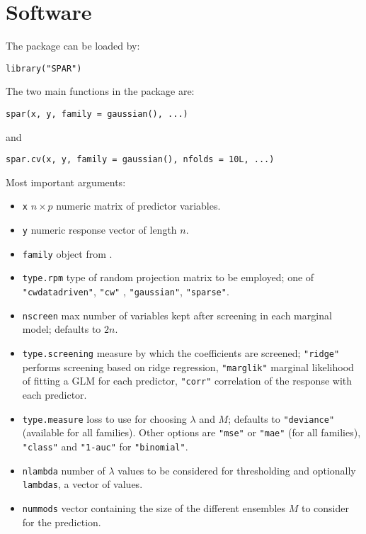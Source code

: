 \documentclass[
  article]{jss}
\newcommand{\fct}[1]{\code{#1()}}
\begin{document}
\section{Software}\label{sec-software}

The package can be loaded by:

\begin{verbatim}
library("SPAR")
\end{verbatim}

The two main functions in the package are:

\begin{verbatim}
spar(x, y, family = gaussian(), ...)
\end{verbatim}

and

\begin{verbatim}
spar.cv(x, y, family = gaussian(), nfolds = 10L, ...)
\end{verbatim}

Most important arguments:

\begin{itemize}
\item
  \texttt{x} \(n \times p\) numeric matrix of predictor variables.
\item
  \texttt{y} numeric response vector of length \(n\).
\item
  \texttt{family} object from \fct{stats::family}.
\item
  \texttt{type.rpm} type of random projection matrix to be employed; one
  of \texttt{"cwdatadriven"}, \texttt{"cw"}
  \citet{Clarkson2013LowRankApproxShort}, \texttt{"gaussian"},
  \texttt{"sparse"}.
\item
  \texttt{nscreen} max number of variables kept after screening in each
  marginal model; defaults to \(2n\).
\item
  \texttt{type.screening} measure by which the coefficients are
  screened; \texttt{"ridge"} performs screening based on ridge
  regression, \texttt{"marglik"} marginal likelihood of fitting a GLM
  for each predictor, \texttt{"corr"} correlation of the response with
  each predictor.
\item
  \texttt{type.measure} loss to use for choosing \(\lambda\) and \(M\);
  defaults to \texttt{"deviance"} (available for all families). Other
  options are \texttt{"mse"} or \texttt{"mae"} (for all families),
  \texttt{"class"} and \texttt{"1-auc"} for \texttt{"binomial"}.
\item
  \texttt{nlambda} number of \(\lambda\) values to be considered for
  thresholding and optionally \texttt{lambdas}, a vector of values.
\item
  \texttt{nummods} vector containing the size of the different ensembles
  \(M\) to consider for the prediction.
\end{itemize}
\end{document}
